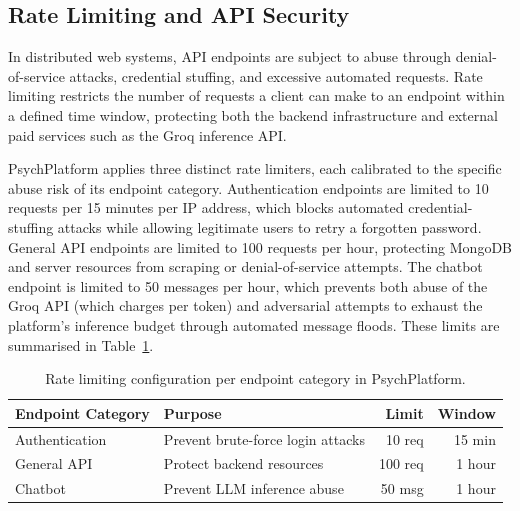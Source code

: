 \documentclass[a4paper,12pt]{report}
\renewcommand{\arraystretch}{1.25}
\begin{document}
\subsection{Rate Limiting and API Security}
\label{subsec:rate-limiting}

In distributed web systems, API endpoints are subject to abuse through denial-of-service attacks, credential stuffing, and excessive automated requests. Rate limiting restricts the number of requests a client can make to an endpoint within a defined time window, protecting both the backend infrastructure and external paid services such as the Groq inference API.

PsychPlatform applies three distinct rate limiters, each calibrated to the specific abuse risk of its endpoint category. Authentication endpoints are limited to 10 requests per 15 minutes per IP address, which blocks automated credential-stuffing attacks while allowing legitimate users to retry a forgotten password. General API endpoints are limited to 100 requests per hour, protecting MongoDB and server resources from scraping or denial-of-service attempts. The chatbot endpoint is limited to 50 messages per hour, which prevents both abuse of the Groq API (which charges per token) and adversarial attempts to exhaust the platform's inference budget through automated message floods. These limits are summarised in Table~\ref{tab:rate-limiters}.

\begin{table}[H]
  \centering
  \caption{Rate limiting configuration per endpoint category in PsychPlatform.}
  \label{tab:rate-limiters}
  \renewcommand{\arraystretch}{1.35}
  \begin{tabularx}{0.85\linewidth}{@{} l X r r @{}}
    \toprule
    \rowcolor{medgray}
    \textbf{Endpoint Category} & \textbf{Purpose} & \textbf{Limit} & \textbf{Window} \\
    \midrule
    Authentication             & Prevent brute-force login attacks & 10 req  & 15 min \\
\midrule
    \rowcolor{lightgray}
    General API                & Protect backend resources          & 100 req & 1 hour \\
\midrule
    Chatbot                    & Prevent LLM inference abuse        & 50 msg  & 1 hour \\
    \bottomrule
  \end{tabularx}
\end{table}
\end{document}
